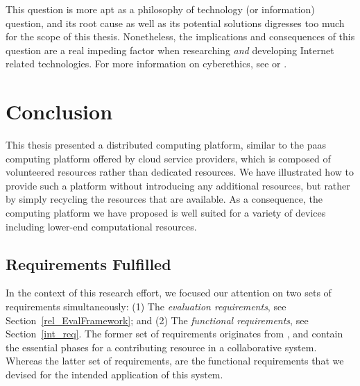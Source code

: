 \documentclass[12pt, titlepage]{uo_temp}
\begin{document}
     This question is more apt as a philosophy of technology (or information) question,
     and its root cause as well as its potential solutions digresses too much for the scope
     of this thesis. Nonetheless, the implications and consequences of this question are a
     real impeding factor when researching \emph{and} developing Internet related
     technologies. For more information on cyberethics, see \cite{spinello2010cyberethics}
     or \cite{tavani2010ethics}.

     \chapter{Conclusion}
     This thesis presented a distributed computing platform, similar to the \gls{paas}
     computing platform offered by cloud service providers, which is composed of volunteered
     resources rather than dedicated resources. We have illustrated how to provide such a
     platform without introducing any additional resources, but rather by simply recycling
     the resources that are available. As a consequence, the computing platform we have
     proposed is well suited for a variety of devices including lower-end computational
     resources.

     \section{Requirements Fulfilled}
     In the context of this research effort, we focused our attention on two sets of
     requirements simultaneously: (1) The \emph{evaluation requirements}, see
     Section~\ref{rel_EvalFramework}; and (2) The \emph{functional requirements}, see
     Section~\ref{int_req}. The former set of requirements originates from
     \cite{p2p_collab}, and contain the essential phases for a contributing resource in a
     collaborative system. Whereas the latter set of requirements, are the functional
     requirements that we devised for the intended application of this system.
\end{document}

